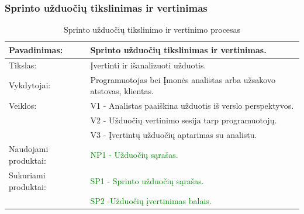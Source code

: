 \documentclass{VUMIFPSkursinis}
\begin{document}
	\subsubsection{Sprinto užduočių tikslinimas ir vertinimas}
	\begin{center}
		\begin{table}[ht]
			\caption{Sprinto užduočių tikslinimo ir vertinimo procesas}
			\begin{tabular}{ | l | l | }
				\hline
				Pavadinimas:		& Sprinto užduočių tikslinimas ir vertinimas.				\\ \hline
				Tikslas: 		& Įvertinti ir išanalizuoti užduotis.					\\ \hline
				Vykdytojai:		& Programuotojas bei Įmonės analistas arba užsakovo atstovas, klientas.	\\ \hline
				Veiklos:		& V1 - Analistas paaiškina užduotis iš verslo perspektyvos. 		\\
							& V2 - Užduočių vertinimo sesija tarp programuotojų.			\\
							& V3 - Įvertintų užduočių aptarimas su analistu. 			\\ \hline
				Naudojami produktai:	& \textcolor{green}{NP1 - Užduočių sąrašas. }						\\ \hline
				Sukuriami produktai:	& \textcolor{green}{SP1 - Sprinto užduočių sąrašas.} 					\\
							& \textcolor{green}{SP2 -Užduočių įvertinimas balais.	}				\\ \hline
			\end{tabular}
		\end{table}
	\end{center}
\end{document}
